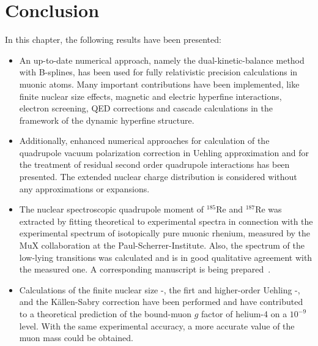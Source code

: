 \section{Conclusion}
\label{sec:muon_summary}
In this chapter, the following results have been presented:\\
\begin{itemize}
\setlength{\itemsep}{0.5cm}
\item An up-to-date numerical approach, namely the dual-kinetic-balance method with B-splines, has been used for fully relativistic precision calculations in muonic atoms. Many important contributions have been implemented, like finite nuclear size effects, magnetic and electric hyperfine interactions, electron screening, QED corrections and cascade calculations in the framework of the dynamic hyperfine structure. 
\item Additionally, enhanced numerical approaches for calculation of the quadrupole vacuum polarization correction in Uehling approximation and for the treatment of residual second order quadrupole interactions has been presented. The extended nuclear charge distribution is considered without any approximations or expansions. 
\item  The nuclear spectroscopic quadrupole moment of $^{185}$Re and $^{187}$Re was extracted by fitting theoretical to experimental spectra in connection with the experimental spectrum of isotopically pure muonic rhenium, measured by the MuX collaboration at the Paul-Scherrer-Institute. Also, the spectrum of the low-lying transitions was calculated and is in good qualitative agreement with the measured one. A corresponding manuscript is being prepared~\cite{psiReDraft}.
\item Calculations of the finite nuclear size -, the firt and higher-order Uehling -, and the Källen-Sabry correction have been performed and have contributed to a theoretical prediction of the bound-muon $g$ factor of helium-4 on a $10^{-9}$ level. With the same experimental accuracy, a more accurate value of the muon mass could be obtained. 
\end{itemize}
